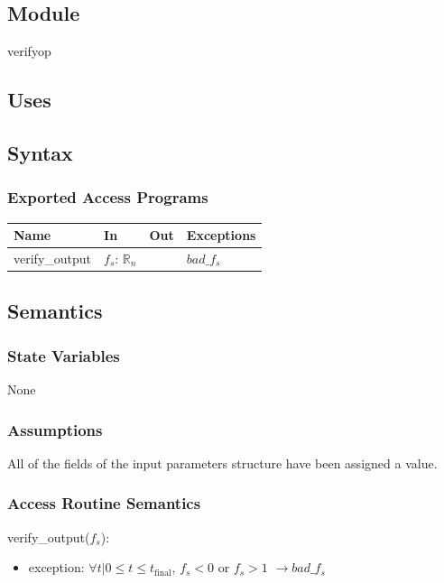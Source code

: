 \documentclass[12pt, titlepage]{article}
\begin{document}
\subsection{Module}

verifyop

\subsection{Uses}

\subsection{Syntax}

\subsubsection{Exported Access Programs}

\begin{center}
\begin{tabular}{p{3cm} p{7cm} p{1cm} p{2cm}}
\hline
\textbf{Name} & \textbf{In} & \textbf{Out} & \textbf{Exceptions} \\
\hline
verify\_output & $f_s$: $\mathbb{R}_n$ &  & $bad\_f_s$\\
\hline
\end{tabular}
\end{center}

\subsection{Semantics}

\subsubsection{State Variables}

None

\subsubsection{Assumptions}

All of the fields of the input parameters structure have been assigned a
value.  

\subsubsection{Access Routine Semantics}

\noindent verify\_output($f_s$):
\begin{itemize}
\item exception: $\forall t | 0 \leq t \leq t_\text{final}$,  $f_s < 0$ or $f_s > 1$  $\rightarrow bad\_f_s$\\
\end{itemize}
\end{document}
